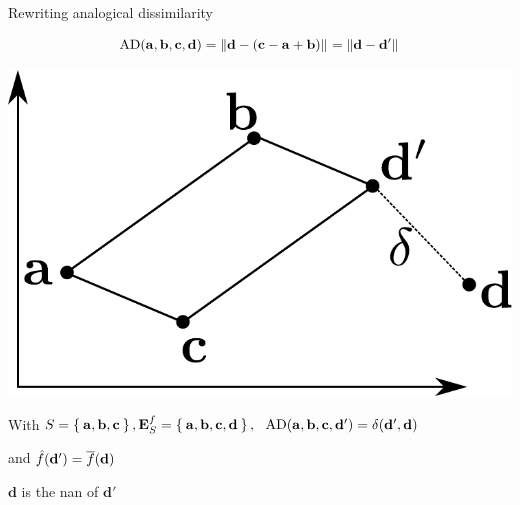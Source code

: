 \documentclass{beamer}
\begin{document}
\begin{frame}{Rewriting analogical dissimilarity}

$$\text{AD}(\mathbf{a},\mathbf{b},\mathbf{c},\mathbf{d})={\left\lVert\mathbf{d} -
(\mathbf{c}-\mathbf{a}+\mathbf{b})\right\rVert}_{}={\left\lVert\mathbf{d} - \mathbf{d}'\right\rVert}_{}$$
\begin{center}
  \includegraphics[width=.2\textwidth]{figures/analogical_dissimilarity.pdf}
\end{center}

  With $S = \Set{\mathbf{a}, \mathbf{b}, \mathbf{c}}, \mathbf{E}_{S}^{f} = \Set{\mathbf{a},
  \mathbf{b}, \mathbf{c}, \mathbf{d}}, ~~ \text{AD}(\mathbf{a}, \mathbf{b},
  \mathbf{c}, \mathbf{d}') = \delta(\mathbf{d}', \mathbf{d})$

  and $\hat{f}(\mathbf{d}') = \overline{f}(\mathbf{d})$

  $\mathbf{d}$ is the \alert{nan} of $\mathbf{d}'$
\end{frame}
\end{document}
